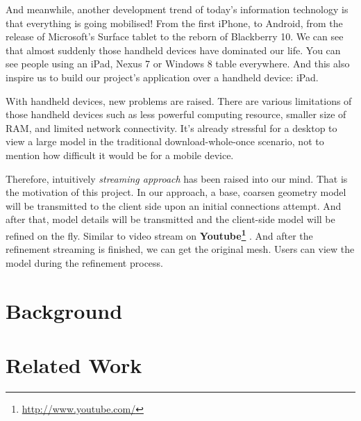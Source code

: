 \smallskip
And meanwhile, another development trend of today's information technology is that everything is going mobilised! From the first iPhone, to Android, from the release of Microsoft's Surface tablet to the reborn of Blackberry 10. We can see that almost suddenly those handheld devices have dominated our life. You can see people using an iPad, Nexus 7 or Windows 8 table everywhere. And this also inspire us to build our project's application over a handheld device: iPad. 

\smallskip
With handheld devices, new problems are raised. There are various limitations of those handheld devices such as less powerful computing resource, smaller size of RAM, and limited network connectivity. It's already stressful for a desktop to view a large model in the traditional download-whole-once scenario, not to mention how difficult it would be for a mobile device. 

\smallskip
Therefore, intuitively \emph{streaming approach} has been raised into our mind. That is the motivation of this project. In our approach, a base, coarsen geometry model will be transmitted to the client side upon an initial connections attempt. And after that, model details will be transmitted and the client-side model will be refined on the fly. Similar to video stream on \textbf{Youtube\footnote{\label{UTUBE}\url{http://www.youtube.com/}} }. And after the refinement streaming is finished, we can get the original mesh. Users can view the model during the refinement process. 


\section{Background}
\label{section:background}

\section{Related Work}
\label{section:relWork}



